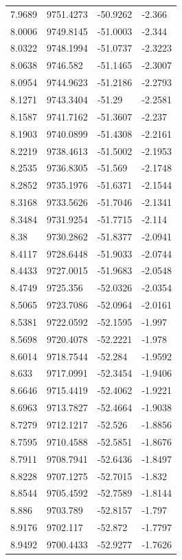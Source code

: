 \begin{table}[H]
\begin{tabular}{llll}
7.9689 & 9751.4273 & -50.9262 & -2.366 \\
8.0006 & 9749.8145 & -51.0003 & -2.344 \\
8.0322 & 9748.1994 & -51.0737 & -2.3223 \\
8.0638 & 9746.582 & -51.1465 & -2.3007 \\
8.0954 & 9744.9623 & -51.2186 & -2.2793 \\
8.1271 & 9743.3404 & -51.29 & -2.2581 \\
8.1587 & 9741.7162 & -51.3607 & -2.237 \\
8.1903 & 9740.0899 & -51.4308 & -2.2161 \\
8.2219 & 9738.4613 & -51.5002 & -2.1953 \\
8.2535 & 9736.8305 & -51.569 & -2.1748 \\
8.2852 & 9735.1976 & -51.6371 & -2.1544 \\
8.3168 & 9733.5626 & -51.7046 & -2.1341 \\
8.3484 & 9731.9254 & -51.7715 & -2.114 \\
8.38 & 9730.2862 & -51.8377 & -2.0941 \\
8.4117 & 9728.6448 & -51.9033 & -2.0744 \\
8.4433 & 9727.0015 & -51.9683 & -2.0548 \\
8.4749 & 9725.356 & -52.0326 & -2.0354 \\
8.5065 & 9723.7086 & -52.0964 & -2.0161 \\
8.5381 & 9722.0592 & -52.1595 & -1.997 \\
8.5698 & 9720.4078 & -52.2221 & -1.978 \\
8.6014 & 9718.7544 & -52.284 & -1.9592 \\
8.633 & 9717.0991 & -52.3454 & -1.9406 \\
8.6646 & 9715.4419 & -52.4062 & -1.9221 \\
8.6963 & 9713.7827 & -52.4664 & -1.9038 \\
8.7279 & 9712.1217 & -52.526 & -1.8856 \\
8.7595 & 9710.4588 & -52.5851 & -1.8676 \\
8.7911 & 9708.7941 & -52.6436 & -1.8497 \\
8.8228 & 9707.1275 & -52.7015 & -1.832 \\
8.8544 & 9705.4592 & -52.7589 & -1.8144 \\
8.886 & 9703.789 & -52.8157 & -1.797 \\
8.9176 & 9702.117 & -52.872 & -1.7797 \\
8.9492 & 9700.4433 & -52.9277 & -1.7626 \\

\end{tabular}
\end{table}
